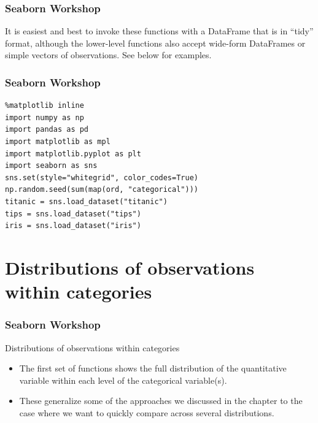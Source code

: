 \documentclass{beamer}
\begin{document}
\begin{frame}[fragile]
\frametitle{Seaborn Workshop}
\large
It is easiest and best to invoke these functions with a DataFrame that is in “tidy” format, although the lower-level functions also accept wide-form DataFrames or simple vectors of observations. See below for examples.
\end{frame}
\begin{frame}[fragile]
\frametitle{Seaborn Workshop}
\large
\begin{verbatim}
%matplotlib inline
import numpy as np
import pandas as pd
import matplotlib as mpl
import matplotlib.pyplot as plt
import seaborn as sns
sns.set(style="whitegrid", color_codes=True)
np.random.seed(sum(map(ord, "categorical")))
titanic = sns.load_dataset("titanic")
tips = sns.load_dataset("tips")
iris = sns.load_dataset("iris")
\end{verbatim}

\end{frame}
\section{Distributions of observations within categories}
\begin{frame}[fragile]
\frametitle{Seaborn Workshop}
Distributions of observations within categories
\begin{itemize}
\item The first set of functions shows the full distribution of the quantitative variable within each level of the categorical variable(s). 
\item These generalize some of the approaches we discussed in the chapter to the case where we want to quickly compare across several distributions.
\end{itemize}

\end{frame}
\end{document}
